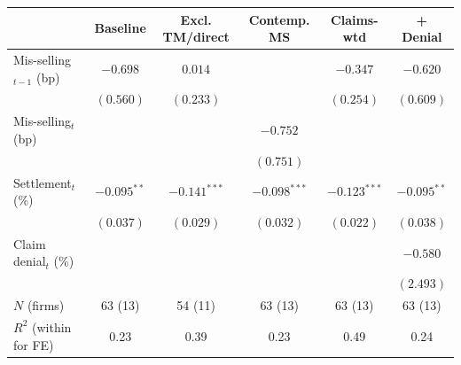 \begin{tabular}{lccccc}
\toprule
 & Baseline & Excl. TM/direct & Contemp. MS & Claims-wtd & + Denial \\
\midrule
Mis-selling$_{t-1}$ (bp) & $-0.698$ & $0.014$ &  & $-0.347$ & $-0.620$ \\
 & $(0.560)$ & $(0.233)$ &  & $(0.254)$ & $(0.609)$ \\
Mis-selling$_t$ (bp) &  &  & $-0.752$ &  &  \\
 &  &  & $(0.751)$ &  &  \\
Settlement$_t$ (\%) & $-0.095^{**}$ & $-0.141^{***}$ & $-0.098^{***}$ & $-0.123^{***}$ & $-0.095^{**}$ \\
 & $(0.037)$ & $(0.029)$ & $(0.032)$ & $(0.022)$ & $(0.038)$ \\
Claim denial$_t$ (\%) &  &  &  &  & $-0.580$ \\
 &  &  &  &  & $(2.493)$ \\
\midrule
$N$ (firms) & 63 (13) & 54 (11) & 63 (13) & 63 (13) & 63 (13) \\
$R^2$ (within for FE) & 0.23 & 0.39 & 0.23 & 0.49 & 0.24 \\
\bottomrule
\end{tabular}